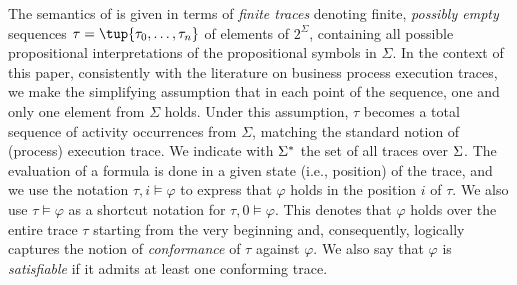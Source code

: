 The semantics of \LTLf is given in terms of \emph{finite traces} denoting finite, \emph{possibly empty} sequences $\tau=\tup{\tau_0, \ldots, \tau_n}$ of elements of $2^\Sigma$, containing all possible propositional interpretations of the propositional symbols in $\Sigma$. In the context of this paper, consistently with the literature on business process execution traces, we make the simplifying assumption that in each point of the sequence, one and only one element from $\Sigma$ holds. Under this assumption, $\tau$ becomes a total sequence of activity occurrences from $\Sigma$, matching the standard notion of (process) execution trace. We indicate with $\Sigma^*$ the set of all traces over $\Sigma$. The evaluation of a formula is done in a given state (i.e., position) of the trace, and we use the notation $\tau,i\models \varphi$ to express that $\varphi$ holds in the position $i$ of $\tau$. We also use $\tau \models \varphi$ as a shortcut notation for $\tau,0\models\varphi$. This denotes that $\varphi$ holds over the entire trace $\tau$ starting from the very beginning and, consequently, logically captures the notion of \emph{conformance} of $\tau$ against $\varphi$. We also say that $\varphi$ is \emph{satisfiable} if it admits at least one conforming trace.



